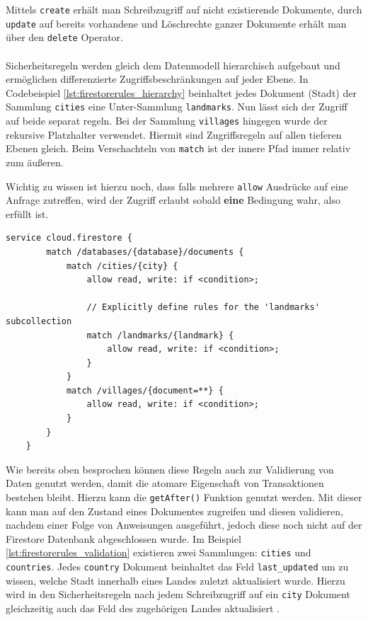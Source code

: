 Mittels \texttt{create} erhält man Schreibzugriff auf nicht existierende Dokumente, durch \texttt{update} auf bereits vorhandene und Löschrechte ganzer Dokumente erhält man über den \texttt{delete} Operator.\\
\\
Sicherheitsregeln werden gleich dem Datenmodell hierarchisch aufgebaut und ermöglichen differenzierte Zugriffsbeschränkungen auf jeder Ebene.
In Codebeispiel \ref{lst:firestorerules_hierarchy} beinhaltet jedes Dokument (Stadt) der Sammlung \texttt{cities} eine Unter-Sammlung \texttt{landmarks}. Nun lässt sich der Zugriff auf beide separat regeln.
Bei der Sammlung \texttt{villages} hingegen wurde der rekursive Platzhalter verwendet. Hiermit sind Zugriffsregeln auf allen tieferen Ebenen gleich.
Beim Verschachteln von \texttt{match} ist der innere Pfad immer relativ zum äußeren.

Wichtig zu wissen ist hierzu noch, dass falls mehrere \texttt{allow} Ausdrücke auf eine Anfrage zutreffen, wird der Zugriff erlaubt sobald \textbf{eine} Bedingung wahr, also erfüllt ist.\\

\begin{lstlisting}[caption=Hierarchische Zugriffsbeschränkung, label=lst:firestorerules_hierarchy]
	service cloud.firestore {
		match /databases/{database}/documents {
			match /cities/{city} {
				allow read, write: if <condition>;
				
				// Explicitly define rules for the 'landmarks' subcollection
				match /landmarks/{landmark} {
					allow read, write: if <condition>;
				}
			}
			match /villages/{document=**} {
				allow read, write: if <condition>;
			}
		}
	}
\end{lstlisting}

\noindent
Wie bereits oben besprochen können diese Regeln auch zur Validierung von Daten genutzt werden, damit die atomare Eigenschaft von Transaktionen bestehen bleibt.
Hierzu kann die \texttt{getAfter()} Funktion genutzt werden. 
Mit dieser kann man auf den Zustand eines Dokumentes zugreifen und diesen validieren, nachdem einer Folge von Anweisungen ausgeführt, jedoch diese noch nicht auf der Firestore Datenbank abgeschlossen wurde.
Im Beispiel \ref{lst:firestorerules_validation} existieren zwei Sammlungen: \texttt{cities} und \texttt{countries}. 
Jedes \texttt{country} Dokument beinhaltet das Feld \texttt{last\_updated} um zu wissen, welche Stadt innerhalb eines Landes zuletzt aktualisiert wurde.
Hierzu wird in den Sicherheitsregeln nach jedem Schreibzugriff auf ein \texttt{city} Dokument gleichzeitig auch das Feld des zugehörigen Landes aktualisiert \cite{firebase2021}.\\

